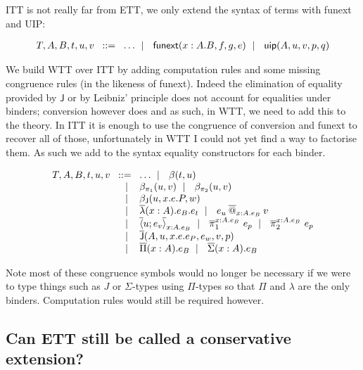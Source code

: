 \acrshort{ITT} is not really far from \acrshort{ETT}, we only extend the syntax
of terms with \acrshort{funext} and \acrshort{UIP}:

\[
  \begin{array}{l@{~\,}r@{~\,}l}
    T,A,B,t,u,v &\bnf& \dots \bnfor \funext{x:A}{B}{f}{g}{e} \bnfor
    \uip{A}{u}{v}{p}{q}
  \end{array}
\]

We build \acrshort{WTT} over \acrshort{ITT} by adding computation rules
and some missing congruence rules (in the likeness of \acrshort{funext}).
Indeed the elimination of equality provided by \(\mathsf{J}\) or by Leibniz'
principle does not account for equalities under binders; conversion however does
and as such, in \acrshort{WTT}, we need to add this to the theory.
In \acrshort{ITT} it is enough to use the congruence of conversion and
\acrshort{funext} to recover all of those, unfortunately in \acrshort{WTT} I
could not yet find a way to factorise them. As such we add to the syntax
equality constructors for each binder.

\[
  \begin{array}{l@{~\,}r@{~\,}l}
    T,A,B,t,u,v &\bnf& \dots \bnfor \beta(t,u) \\
    &\bnfor& \redpio(u,v) \bnfor \redpit(u,v) \\
    &\bnfor& \redJ(u,x.e.P,w) \\
    &\bnfor& \lamb{x:A}{e_B} e_t
    \bnfor \appb{e_u}{x:A}{e_B}{v} \\
    &\bnfor& \pairb{x:A}{e_B}{u}{e_v}
    \bnfor \piob{x:A}{e_B}{e_p} \bnfor \pitb{x:A}{e_B}{e_p} \\
    &\bnfor& \Jb(A,u,x.e.e_P,e_w,v,p) \\
    &\bnfor& \pib (x:A). e_B \bnfor \sumb (x:A). e_B
  \end{array}
\]

Note most of these congruence symbols would no longer be necessary if we were to
type things such as \(J\) or \(\Sigma\)-types using \(\Pi\)-types so that
\(\Pi\) and \(\lambda\) are the only binders. Computation rules would still be
required however.

\subsection{Can \acrshort{ETT} still be called a conservative extension?}

